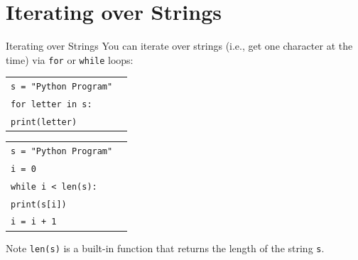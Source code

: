 \documentclass[t,handout,9pt]{beamer}
\begin{document}
\section{Iterating over Strings}
\begin{frame}{Iterating over Strings}
\vfill
You can iterate over strings (i.e., get one character at the time) via \texttt{for} or \texttt{while} loops:
\vfill
\begin{table}[]
\begin{flushleft}
\begin{tabular}{ll}
\texttt{s = "Python Program"} &  \\
\texttt{for letter in s:} &  \\
\texttt{\qquad print(letter)} &  \\
\end{tabular}
\end{flushleft}
\end{table}
\vfill
\begin{table}[]
\begin{flushleft}
\begin{tabular}{ll}
\texttt{s = "Python Program"} &  \\
\texttt{i = 0} &  \\
\texttt{while i < len(s):} &  \\
\texttt{\qquad print(s[i])} &  \\
\texttt{\qquad i = i + 1} &  \\
\end{tabular}
\end{flushleft}
\end{table}
\vfill
\begin{block}{Note}
\texttt{len(s)} is a built-in function that returns the length of the string \texttt{s}.
\end{block}
\vfill
\end{frame}
%
\end{document}
